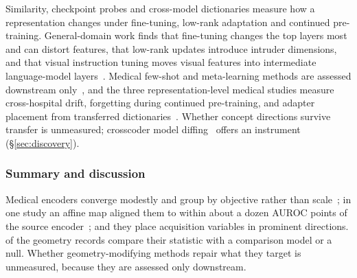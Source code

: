 Similarity, checkpoint probes and cross-model dictionaries measure how a representation changes under
fine-tuning, low-rank adaptation and continued pre-training. General-domain work finds that fine-tuning
changes the top layers most and can distort features, that low-rank updates introduce intruder
dimensions, and that visual instruction tuning moves visual features into intermediate language-model
layers~\cite{merchant2020what,zhou2021closer,kumar2022fine,lee2022surgical,raghu2019rapid,biderman2024lora,shuttleworth2024lora,palacios2026visual,verma2024cross}.
Medical few-shot and meta-learning methods are assessed downstream only~\cite{bo2025famnet,wang2025task},
and the three representation-level medical studies measure cross-hospital drift, forgetting during
continued pre-training, and adapter placement from transferred
dictionaries~\cite{theofilou2025stable,zoellin2024block,sadanandan2026mechanistically}. Whether concept
directions survive transfer is unmeasured; crosscoder model diffing~\cite{minder2025overcoming} offers
an instrument (\S\ref{sec:discovery}).

\subsubsection{Summary and discussion}

Medical encoders converge modestly and group by objective rather than
scale~\cite{tayebiarasteh2026self}; in one study an affine map aligned them to within about a dozen
AUROC points of the source encoder~\cite{folco2025semantic}; and they place acquisition variables in
prominent directions. \Vgeoany{} of the \Vgeon{} geometry records compare their statistic with a
comparison model or a null. Whether geometry-modifying methods repair what they target is unmeasured,
because they are assessed only downstream.
